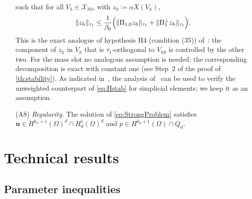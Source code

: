 \documentclass[11pt]{article}
\theoremstyle{remark}
\newcommand{\bu}{\boldsymbol{u}}
\newcommand{\norm}[1]{\lVert #1 \rVert}
\newcommand{\Ponez}{\Pi_{1,0}}
\newcommand{\Poneo}{\Pi_{1}^{\perp}}
\newcommand{\Xhz}{\mathcal{X}_{h0}}
\begin{document}
\begin{itemize}[leftmargin=3.2em, itemsep=0.35ex]
  such that for all $V_h \in \Xhz$, with $z_h \coloneqq \alpha X(V_h)$,
  \begin{equation}
    \label{eq:Hstab}
    \norm{z_h}_{\tau_1}
    \le \frac{1}{\beta_0}
    \Bigl( \norm{\Ponez z_h}_{\tau_1} + \norm{\Poneo z_h}_{\tau_1} \Bigr).
  \end{equation}
  This is the exact analogue of hypothesis H4 (condition (35)) of~\cite{Codina2008}:
  the component of $z_h$ in $V_h$ that is $\tau_1$-orthogonal to $V_{h0}$ is controlled
  by the other two. For the mass slot no analogous assumption is needed: the
  corresponding decomposition is exact with constant one (see Step~2 of the proof of
  \cref{th:stability}). As indicated in~\cite{Codina2008}, the analysis
  of~\cite{CodinaBlasco1997} can be used to verify the unweighted counterpart of
  \cref{eq:Hstab} for simplicial elements; we keep it as an assumption.
  \item[(A8)] \emph{Regularity.} The solution of \cref{eq:StrongProblem} satisfies
  $\bu \in H^{k_u+1}(\Omega)^d \cap H^1_0(\Omega)^d$ and
  $p \in H^{k_p+1}(\Omega) \cap Q_0$.
\end{itemize}

\section{Technical results}
\label{sec:technical}

\subsection{Parameter inequalities}
\end{document}
